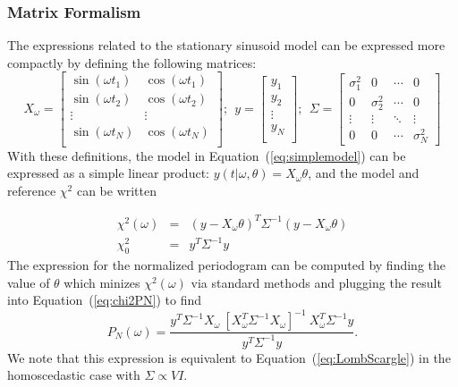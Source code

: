 \documentclass[12pt,preprint]{aastex}
\newcommand{\Eq}[1]{Equation~(\ref{eq:#1})}
\newcommand{\eq}[1]{\Eq{#1}}
\newcommand{\eqlabel}[1]{\label{eq:#1}}
\begin{document}
\subsubsection{Matrix Formalism}
The expressions related to the stationary sinusoid model can be expressed more compactly by defining the following matrices:
\begin{equation}
X_\omega = \left[
\begin{array}{cc}
\sin(\omega t_1) & \cos(\omega t_1)\\
\sin(\omega t_2) & \cos(\omega t_2)\\
\vdots & \vdots \\
\sin(\omega t_N) & \cos(\omega t_N)\\
\end{array}
\right];~~
y = \left[
\begin{array}{c}
y_1 \\
y_2\\
\vdots \\
y_N\\
\end{array}
\right];~~
\Sigma = \left[
\begin{array}{cccc}
\sigma_1^2 & 0 &  \cdots & 0\\
0 & \sigma_2^2 &  \cdots & 0\\
\vdots & \vdots &  \ddots & \vdots\\
0 & 0 &  \cdots & \sigma_N^2
\end{array}
\right]
\end{equation}
With these definitions, the model in \eq{simplemodel} can be expressed as a simple linear product: $y(t|\omega,\theta) = X_\omega\theta$, and the model and reference $\chi^2$ can be written

\begin{eqnarray}
  \chi^2(\omega) &=& (y - X_\omega\theta)^T\Sigma^{-1}(y - X_\omega\theta)\\
  \chi^2_0 &=& y^T \Sigma^{-1} y
\end{eqnarray}
The expression for the normalized periodogram can be computed by finding the value of $\theta$ which minizes $\chi^2(\omega)$ via standard methods and plugging the result into \eq{chi2PN} to find
\begin{equation}
  \eqlabel{LombScargle2}
  P_N(\omega) = \frac{y^T\Sigma^{-1}X_\omega~[X_\omega^T\Sigma^{-1}X_\omega]^{-1}~X_\omega^T\Sigma^{-1}y}{y^T\Sigma^{-1}y}.
\end{equation}
We note that this expression is equivalent to \eq{LombScargle} in the homoscedastic case with $\Sigma \propto V I$.
\end{document}
